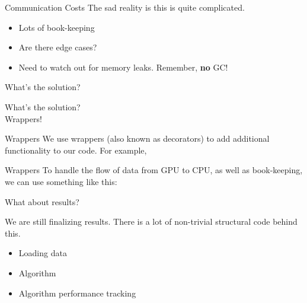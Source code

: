 \documentclass{beamer}
\begin{document}
\begin{frame}{Communication Costs}
  The sad reality is this is quite complicated.

  \begin{itemize}
    \item Lots of book-keeping
    \item Are there edge cases?
    \item Need to watch out for memory leaks. Remember, \textbf{no} GC!
  \end{itemize}
\end{frame}

\begin{frame}[standout]
  What's the solution?
\end{frame}

\begin{frame}[standout]
  What's the solution?\\
  Wrappers!
\end{frame}

\begin{frame}{Wrappers}
  We use wrappers (also known as decorators) to add additional functionality to
  our code. For example,
\end{frame}

\begin{frame}{Wrappers}
  To handle the flow of data from GPU to CPU, as well as book-keeping, we can
  use something like this:
\end{frame}

\begin{frame}[standout]
  What about results?
\end{frame}

\begin{frame}
  We are still finalizing results. There is a lot of non-trivial structural code
  behind this.
  \begin{itemize}
    \item Loading data
    \item Algorithm
    \item Algorithm performance tracking
  \end{itemize}
\end{frame}

	

\end{document}
